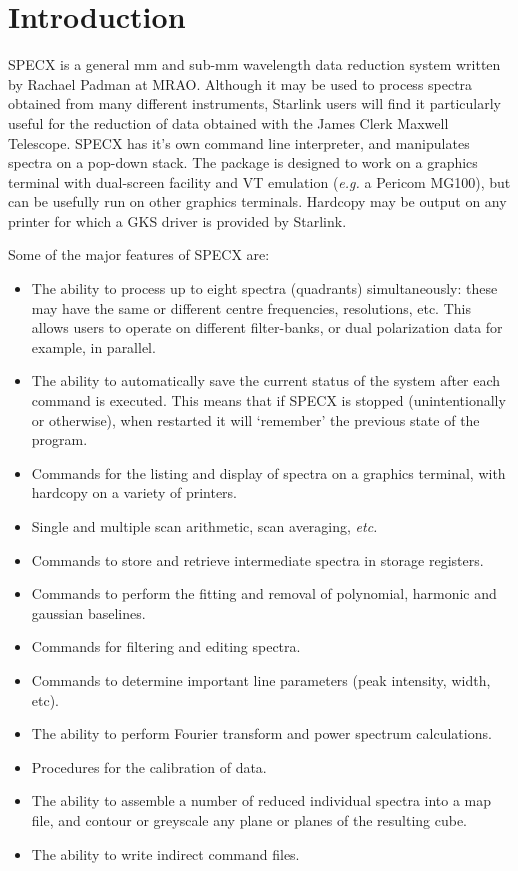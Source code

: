 \section {Introduction}

SPECX is a general mm and sub-mm wavelength data reduction system
written by Rachael Padman at MRAO. Although it may be used to
process spectra obtained from many different instruments,
Starlink users will find it particularly useful for the reduction
of data obtained with the James Clerk Maxwell Telescope. 
SPECX has it's own command line interpreter, and manipulates 
spectra on a pop-down stack. The package is designed to work on
a graphics terminal with dual-screen facility and VT emulation 
({\em e.g.} a Pericom MG100), but can be usefully run
on other graphics terminals. Hardcopy may be output on any printer
for which a GKS driver is provided by Starlink.

Some of the major features of SPECX are:
\begin{itemize}
\item
The ability to process up to eight spectra (quadrants) simultaneously:
these may have the same or different centre frequencies, resolutions, 
etc. This allows users to operate on different filter-banks, or
dual polarization data for example, in parallel. 
\item
The ability to automatically save the current status of the system 
after each command is executed. This means that if SPECX is
stopped (unintentionally or otherwise), when restarted it will
`remember' the previous state of the program.
\item
Commands for the listing and display of spectra on a graphics
terminal, with hardcopy on a variety of printers.
\item
Single and multiple scan arithmetic, scan averaging, {\em etc.}
\item
Commands to store and retrieve intermediate spectra in storage registers.
\item
Commands to perform the fitting and removal of polynomial, 
harmonic and gaussian baselines.
\item
Commands for filtering and editing spectra.
\item
Commands to determine important line parameters (peak intensity, width, 
etc).
\item
The ability to perform Fourier transform and power spectrum calculations.
\item
Procedures for the calibration of data.
\item
The ability to assemble a number of reduced individual spectra into a 
map file, and contour or greyscale any plane or planes of the resulting cube.
\item
The ability to write indirect command files.
\end{itemize}

